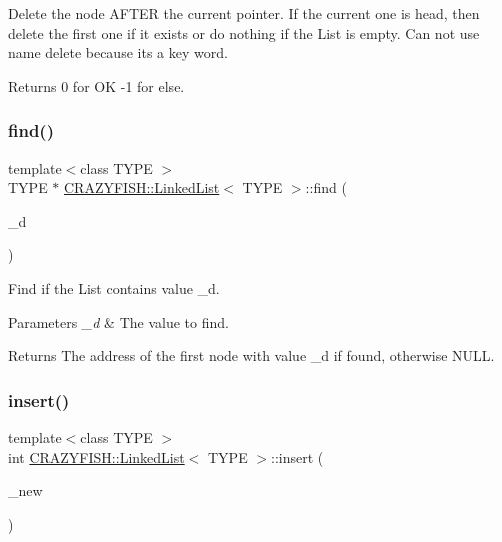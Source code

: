 Delete the node A\+F\+T\+ER the current pointer. If the current one is head, then delete the first one if it exists or do nothing if the List is empty. Can not use name delete because it\textquotesingle{}s a key word.

\begin{DoxyReturn}{Returns}
0 for OK -\/1 for else. 
\end{DoxyReturn}
\mbox{\label{classCRAZYFISH_1_1LinkedList_a9ec77e618ea899c8458824a2a10066de}} 
\subsubsection{\texorpdfstring{find()}{find()}}
{\footnotesize\ttfamily template$<$class T\+Y\+PE $>$ \\
T\+Y\+PE $\ast$ \hyperlink{classCRAZYFISH_1_1LinkedList}{C\+R\+A\+Z\+Y\+F\+I\+S\+H\+::\+Linked\+List}$<$ T\+Y\+PE $>$\+::find (\begin{DoxyParamCaption}\item[{T\+Y\+PE}]{\+\_\+d }\end{DoxyParamCaption})}

Find if the List contains value \+\_\+d.


\begin{DoxyParams}{Parameters}
{\em \+\_\+d} & The value to find.\\
\hline
\end{DoxyParams}
\begin{DoxyReturn}{Returns}
The address of the first node with value \+\_\+d if found, otherwise N\+U\+LL. 
\end{DoxyReturn}
\mbox{\label{classCRAZYFISH_1_1LinkedList_a114e00935149d4c6fb68cc4654a4904c}} 
\subsubsection{\texorpdfstring{insert()}{insert()}\hspace{0.1cm}{\footnotesize\ttfamily [1/2]}}
{\footnotesize\ttfamily template$<$class T\+Y\+PE $>$ \\
int \hyperlink{classCRAZYFISH_1_1LinkedList}{C\+R\+A\+Z\+Y\+F\+I\+S\+H\+::\+Linked\+List}$<$ T\+Y\+PE $>$\+::insert (\begin{DoxyParamCaption}\item[{\hyperlink{classCRAZYFISH_1_1LinkedList_1_1Node}{Node} \&}]{\+\_\+new }\end{DoxyParamCaption})}


